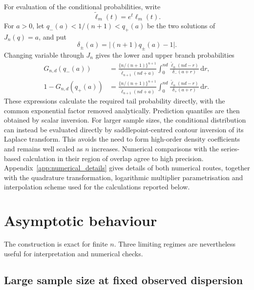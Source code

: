 \documentclass[11pt]{article}
\theoremstyle{remark}
\newcommand{\dd}{\,\mathrm d}
\begin{document}
For evaluation of the conditional probabilities, write
\begin{equation}
 \widetilde\ell_m(t)=e^t\ell_m(t).
 \label{eq:tilted_defs}
\end{equation}
For $a>0$, let $q_-(a)<1/(n+1)<q_+(a)$ be the two solutions of $J_n(q)=a$, and put
\begin{equation}
 \delta_\pm(a)=\big|(n+1)q_\pm(a)-1\big|.
 \label{eq:delta}
\end{equation}
Changing variable through $J_n$ gives the lower and upper branch probabilities
\begin{align}
 G_{n,d}(q_-(a))
 &=\frac{\{n/(n+1)\}^{n+1}}{\widetilde\ell_{n+1}(nd+a)}
   \int_0^{nd}\frac{\widetilde\ell_n(nd-r)}{\delta_-(a+r)}\dd r,
 \label{eq:lower_branch_formula}\\
 1-G_{n,d}(q_+(a))
 &=\frac{\{n/(n+1)\}^{n+1}}{\widetilde\ell_{n+1}(nd+a)}
   \int_0^{nd}\frac{\widetilde\ell_n(nd-r)}{\delta_+(a+r)}\dd r.
 \label{eq:upper_branch_formula}
\end{align}
These expressions calculate the required tail probability directly, with the common exponential factor removed analytically. Prediction quantiles are then obtained by scalar inversion. For larger sample sizes, the conditional distribution can instead be evaluated directly by saddlepoint-centred contour inversion of its Laplace transform. This avoids the need to form high-order density coefficients and remains well scaled as $n$ increases. Numerical comparisons with the series-based calculation in their region of overlap agree to high precision. Appendix~\ref{app:numerical_details} gives details of both numerical routes, together with the quadrature transformation, logarithmic multiplier parametrisation and interpolation scheme used for the calculations reported below.

\section{Asymptotic behaviour}
\label{sec:asymptotics}

The construction is exact for finite $n$. Three limiting regimes are nevertheless useful for interpretation and numerical checks.

\subsection{Large sample size at fixed observed dispersion}
\end{document}
